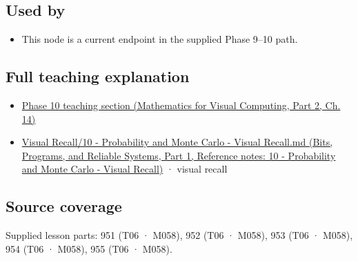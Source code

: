 \subsection{Used by}\label{appendix-33237f0f618b-used-by}

\hypertarget{appendix-33237f0f618b-used-by}{}

\begin{itemize}
\tightlist
\item
  This node is a current endpoint in the supplied Phase 9--10 path.
\end{itemize}

\subsection{Full teaching explanation}\label{appendix-33237f0f618b-full-teaching-explanation}

\hypertarget{appendix-33237f0f618b-full-teaching-explanation}{}

\begin{itemize}
\tightlist
\item
  \href{../02-Mathematics-for-Visual-Computing-P02/main.pdf\#nameddest=02-foundations-ii-ch030-finite-samples-need-stable-descriptive-statistics}{Phase 10 teaching section (Mathematics for Visual Computing, Part 2, Ch. 14)}
\item
  \href{../01-Bits-Programs-and-Reliable-Systems-P01/main.pdf\#nameddest=appendix-cb5af353ef77}{Visual Recall/10 - Probability and Monte Carlo - Visual Recall.md (Bits, Programs, and Reliable Systems, Part 1, Reference notes: 10 - Probability and Monte Carlo - Visual Recall)} · visual recall
\end{itemize}

\subsection{Source coverage}\label{appendix-33237f0f618b-source-coverage}

\hypertarget{appendix-33237f0f618b-source-coverage}{}

Supplied lesson parts: 951 (T06 · M058), 952 (T06 · M058), 953 (T06 · M058), 954 (T06 · M058), 955 (T06 · M058).

